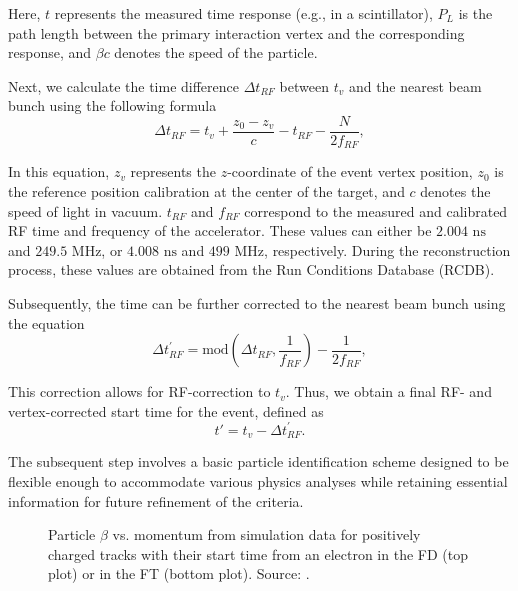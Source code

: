     Here, $t$ represents the measured time response (e.g., in a scintillator), $P_L$ is the path length between the primary interaction vertex and the corresponding response, and $\beta c$ denotes the speed of the particle.

    Next, we calculate the time difference $\Delta t_{RF}$ between $t_v$ and the nearest beam bunch using the following formula
    \begin{equation*}
        \Delta t_{RF} = t_v + \frac{z_0 - z_v}{c} - t_{RF} - \frac{N}{2f_{RF}},
    \end{equation*}

    In this equation, $z_v$ represents the $z$-coordinate of the event vertex position, $z_0$ is the reference position calibration at the center of the target, and $c$ denotes the speed of light in vacuum.
    $t_{RF}$ and $f_{RF}$ correspond to the measured and calibrated RF time and frequency of the accelerator.
    These values can either be $2.004 \text{ ns}$ and $249.5 \text{ MHz}$, or $4.008 \text{ ns}$ and $499 \text{ MHz}$, respectively.
    During the reconstruction process, these values are obtained from the Run Conditions Database (RCDB).

    Subsequently, the time can be further corrected to the nearest beam bunch using the equation
    \begin{equation*}
        \Delta t^\prime_{RF} = \text{mod}\left(\Delta t_{RF}, \frac{1}{f_{RF}}\right) - \frac{1}{2f_{RF}},
    \end{equation*}

    This correction allows for RF-correction to $t_v$. Thus, we obtain a final RF- and vertex-corrected start time for the event, defined as
    \begin{equation*}
        t' = t_v - \Delta t^\prime_{RF}.
    \end{equation*}

    The subsequent step involves a basic particle identification scheme designed to be flexible enough to accommodate various physics analyses while retaining essential information for future refinement of the criteria.

    \begin{wrapfigure}{r}{0.49\textwidth}
        \centering{}
        \caption[Particle $\beta$ vs. momentum for positively charged tracks.]{Particle $\beta$ vs. momentum from simulation data for positively charged tracks with their start time from an electron in the FD (top plot) or in the FT (bottom plot).
        Source: \cite{ziegler2020}.}
        \label{fig::11.232::positive_pid}
    \end{wrapfigure}

